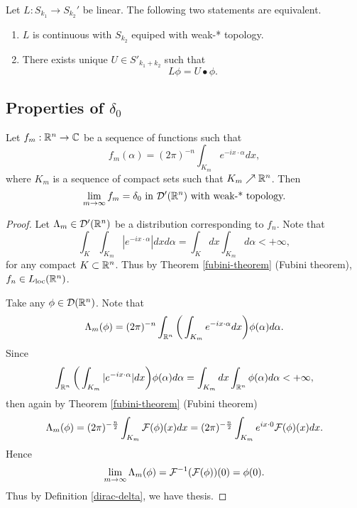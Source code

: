 \documentclass[main.tex]{subfiles}
\begin{document}
\begin{theorem}
\label{swartz-kernel-tempered}
Let $L:S_{k_1}\to S_{k_2}'$ be linear.
The following two statements are equivalent.
\begin{enumerate}
\item
$L$ is continuous with $S_{k_2}$ equiped with weak-* topology.
\item
There exists unique $U\in S'_{k_1 + k_2}$ such that
\begin{equation}
L\phi = U\bullet \phi.
\end{equation} 
\end{enumerate} 
\end{theorem}

\subsection{Properties of $\delta_0$}
\begin{example}
Let $f_m:\mathbb{R}^n\to\mathbb{C}$ be a sequence of functions such that
\begin{equation}
f_m(\alpha) = (2\pi)^{-n} \int_{K_m} e^{-ix\cdot\alpha}dx,  
\end{equation}
where $K_m$ is a sequence of compact sets such that $K_m\nearrow \mathbb{R}^n$. Then 
\begin{equation}
\lim_{m\to\infty} f_m  = \delta_0 \text{ in } \mathcal{D}'(\mathbb{R}^n) \text{ with weak-* topology.}  
\end{equation}
\end{example}
\begin{proof}
Let $\Lambda_m\in \mathcal{D}'(\mathbb{R}^n)$ be a distribution corresponding to $f_n$. Note that
\begin{equation}
\int_K \int_{K_m} |e^{-ix\cdot\alpha}|dxd\alpha = \int_K dx \int_{K_m}d\alpha < +\infty,
\end{equation}
for any compact $K\subset \mathbb{R}^n$.
Thus by Theorem \ref{fubini-theorem} (Fubini theorem), $f_n\in L_{\text{loc}}(\mathbb{R}^n)$.

Take any $\phi\in\mathcal{D}(\mathbb{R}^n)$.
Note that
\begin{equation}
\Lambda_m(\phi) = (2\pi)^{-n} \int_{\mathbb{R}^n} \bigg(\int_{K_m} e^{-ix\cdot\alpha} dx\bigg) \phi(\alpha) d\alpha.
\end{equation}
Since 
\begin{equation}
\int_{\mathbb{R}^n} \bigg(\int_{K_m} |e^{-ix\cdot\alpha}| dx\bigg) \phi(\alpha) d\alpha = \int_{K_m}dx \int_{\mathbb{R}^n} \phi(\alpha)d\alpha < +\infty,
\end{equation}
then again by Theorem \ref{fubini-theorem} (Fubini theorem)
\begin{equation}
\Lambda_m(\phi) = (2\pi)^{-\frac{n}{2}}\int_{K_m} \mathcal{F}(\phi)(x) dx = (2\pi)^{-\frac{n}{2}}\int_{K_m} e^{ix\cdot 0}\mathcal{F}(\phi)(x) dx.
\end{equation}
Hence
\begin{equation}
\lim_{m\to \infty} \Lambda_m(\phi) = \mathcal{F}^{-1}(\mathcal{F}(\phi))(0) = \phi(0).
\end{equation}
Thus by Definition \ref{dirac-delta}, we have thesis.
\end{proof}
\end{document}

